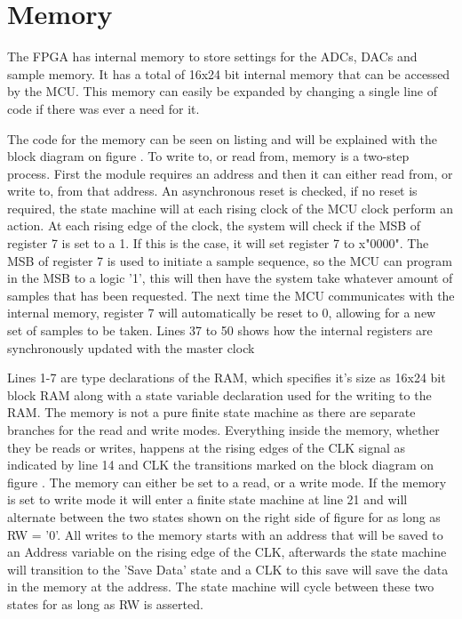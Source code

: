 \section{Memory} \label{subsec:Memory}
The FPGA has internal memory to store settings for the ADCs, DACs and sample memory. It has a total of 16x24 bit internal memory that can be accessed by the MCU. This memory can easily be expanded by changing a single line of code if there was ever a need for it.

The code for the memory can be seen on listing  and will be explained with the block diagram on figure . To write to, or read from, memory is a two-step process. First the module requires an address and then it can either read from, or write to, from that address. An asynchronous reset is checked, if no reset is required, the state machine will at each rising clock of the MCU clock perform an action. At each rising edge of the clock, the system will check if the MSB of register 7 is set to a 1. If this is the case, it will set register 7 to x"0000". The MSB of register 7 is used to initiate a sample sequence, so the MCU can program in the MSB to a logic '1', this will then have the system take whatever amount of samples that has been requested. The next time the MCU communicates with the internal memory, register 7 will automatically be reset to 0, allowing for a new set of samples to be taken. Lines 37 to 50 shows how the internal registers are synchronously updated with the  master clock



Lines 1-7 are type declarations of the RAM, which specifies it's size as 16x24 bit block RAM along with a state variable declaration used for the writing to the RAM. The memory is not a pure finite state machine as there are separate branches for the read and write modes. Everything inside the memory, whether they be reads or writes, happens at the rising edges of the CLK signal as indicated by line 14 and CLK the transitions marked on the block diagram on figure . The memory can either be set to a read, or a write mode. If the memory is set to write mode it will enter a finite state machine at line 21 and will alternate between the two states shown on the right side of figure  for as long as RW = '0'. All writes to the memory starts with an address that will be saved to an Address variable on the rising edge of the CLK, afterwards the state machine will transition to the 'Save Data' state and a CLK to this save will save the data in the memory at the address. The state machine will cycle between these two states for as long as RW is asserted. 



